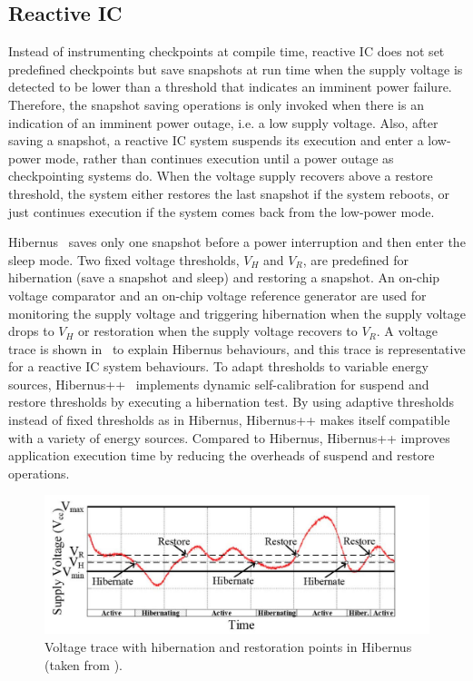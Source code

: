 \subsection{Reactive IC} \label{Section:reactiveic}

Instead of instrumenting checkpoints at compile time, reactive IC does not set predefined checkpoints but save snapshots at run time when the supply voltage is detected to be lower than a threshold that indicates an imminent power failure. Therefore, the snapshot saving operations is only invoked when there is an indication of an imminent power outage, i.e. a low supply voltage. Also, after saving a snapshot, a reactive IC system suspends its execution and enter a low-power mode, rather than continues execution until a power outage as checkpointing systems do. When the voltage supply recovers above a restore threshold, the system either restores the last snapshot if the system reboots, or just continues execution if the system comes back from the low-power mode.

Hibernus~\cite{balsamo2015hibernus} saves only one snapshot before a power interruption and then enter the sleep mode. Two fixed voltage thresholds, $V_H$ and $V_R$, are predefined for hibernation (save a snapshot and sleep) and restoring a snapshot. An on-chip voltage comparator and an on-chip voltage reference generator are used for monitoring the supply voltage and triggering hibernation when the supply voltage drops to $V_H$ or restoration when the supply voltage recovers to $V_R$. A voltage trace is shown in~ to explain Hibernus behaviours, and this trace is representative for a reactive IC system behaviours. To adapt thresholds to variable energy sources, Hibernus++~\cite{balsamo2016hibernus++} implements dynamic self-calibration for suspend and restore thresholds by executing a hibernation test. By using adaptive thresholds instead of fixed thresholds as in Hibernus, Hibernus++ makes itself compatible with a variety of energy sources. Compared to Hibernus, Hibernus++ improves application execution time by reducing the overheads of suspend and restore operations.

\begin{figure}[!htb]
    \centering
    \includegraphics[width=14cm]{ch2_review/figures/hibernus}
    \caption{Voltage trace with hibernation and restoration points in Hibernus (taken from \cite{balsamo2015hibernus}).}
    \label{Figure:hibernus}
\end{figure}


